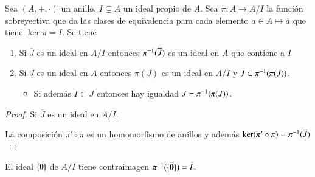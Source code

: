 \begin{pro}
	\label{pro:correspondenciaideales2}
	Sea $(A, +, \cdot)$ un anillo, $I \subsetneq A$ un ideal propio de $A$. Sea $\pi: A \to A/I$ la función sobreyectiva que da las clases de equivalencia para cada elemento $a \in A \mapsto \overline{a}$ que tiene $\ker \pi = I$. Se tiene
	\begin{enumerate}
		\item Si $\overline{J}$ es un ideal en $A/I$ entonces $\pi^{-1}(\overline{J})$ es un ideal en $A$ que contiene a $I$
		\item Si $J$ es un ideal en $A$ entonces $\pi(J)$ es un ideal en $A/I$ y $J \subset \pi^{-1}(\pi(J))$.
		\begin{itemize}
			\item Si además $I \subset J$ entonces hay igualdad $J = \pi^{-1}(\pi(J))$.
		\end{itemize}
	\end{enumerate}
\end{pro}

\begin{proof}
	Si $\overline{J}$ es un ideal en $A/I$.
	
	\begin{figure}[h]
		\centering
	\end{figure}
	La composición $\pi' \circ \pi$ es un homomorfismo de anillos y además $\ker (\pi' \circ \pi) = \pi^{-1}(\overline{J})$
\end{proof}

\begin{obs}
	El ideal $\{\overline{\mathbf{0}}\}$ de $A/I$ tiene contraimagen $\pi^{-1}(\{\overline{\mathbf{0}}\}) = I$.
\end{obs}


